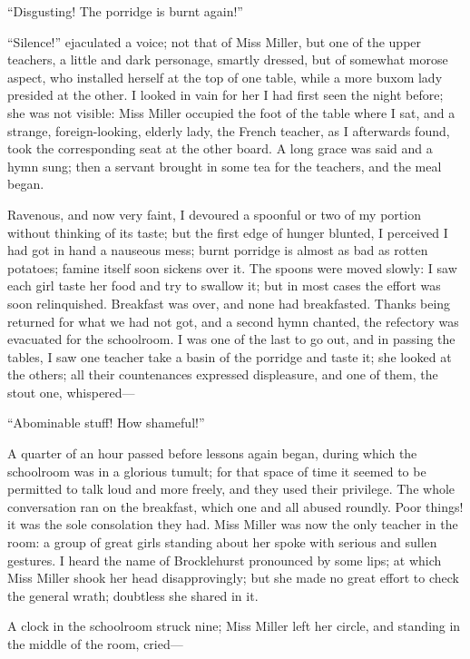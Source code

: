 \enquote{Disgusting! The porridge is burnt again!}

\enquote{Silence!} ejaculated a voice; not that of Miss Miller, but one
of the upper teachers, a little and dark personage, smartly dressed, but
of somewhat morose aspect, who installed herself at the top of one
table, while a more buxom lady presided at the other. I looked in vain
for her I had first seen the night before; she was not visible: Miss
Miller occupied the foot of the table where I sat, and a strange,
foreign-looking, elderly lady, the French teacher, as I afterwards
found, took the corresponding seat at the other board. A long grace was
said and a hymn sung; then a servant brought in some tea for the
teachers, and the meal began.

Ravenous, and now very faint, I devoured a spoonful or two of my portion
without thinking of its taste; but the first edge of hunger blunted, I
perceived I had got in hand a nauseous mess; burnt porridge is almost as
bad as rotten potatoes; famine itself soon sickens over it. The spoons
were moved slowly: I saw each girl taste her food and try to swallow it;
but in most cases the effort was soon relinquished. Breakfast was over,
and none had breakfasted. Thanks being returned for what we had not
got, and a second hymn chanted, the refectory was evacuated for the
schoolroom. I was one of the last to go out, and in passing the tables,
I saw one teacher take a basin of the porridge and taste it; she looked
at the others; all their countenances expressed displeasure, and one of
them, the stout one, whispered---

\enquote{Abominable stuff! How shameful!}

A quarter of an hour passed before lessons again began, during which the
schoolroom was in a glorious tumult; for that space of time it seemed to
be permitted to talk loud and more freely, and they used their
privilege. The whole conversation ran on the breakfast, which one and
all abused roundly. Poor things! it was the sole consolation they had. 
Miss Miller was now the only teacher in the room: a group of great girls
standing about her spoke with serious and sullen gestures. I heard the
name of \Mr{} Brocklehurst pronounced by some lips; at which Miss Miller
shook her head disapprovingly; but she made no great effort to check the
general wrath; doubtless she shared in it.

A clock in the schoolroom struck nine; Miss Miller left her circle, and
standing in the middle of the room, cried---


